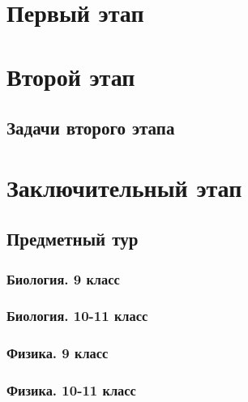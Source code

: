 \documentclass[a4paper,12pt,oneside]{book}
\begin{document}

\setcounter{tocdepth}{1}

\tableofcontents

\part{Первый этап}





\part{Второй этап}
\clearpage
\chapter{Задачи второго этапа}



\part{Заключительный этап}

\clearpage
\chapter{Предметный тур}

\section{Биология. 9 класс}


\section{Биология. 10-11 класс}


\section{Физика. 9 класс}


\section{Физика. 10-11 класс}

\end{document}
